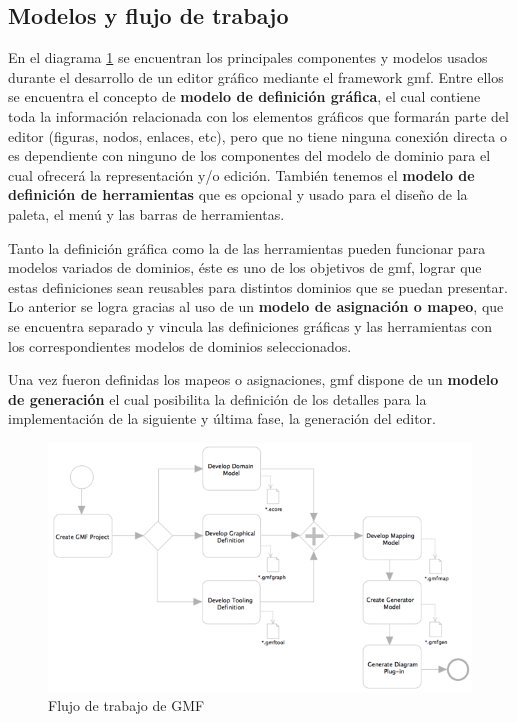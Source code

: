 \documentclass[a4paper,12pt,oneside,spanish]{book}
\begin{document}
\subsection{Modelos y flujo de trabajo}

En el diagrama \ref{fig:GMFWorkflow} se encuentran los principales componentes y modelos usados durante el desarrollo de un editor gráfico mediante el framework \gls{gmf}. Entre ellos se encuentra el concepto de \textbf{modelo de definición gráfica}, el cual contiene toda la información relacionada con los elementos gráficos que formarán parte del editor (figuras, nodos, enlaces, etc), pero que no tiene ninguna conexión directa o es dependiente con ninguno de los componentes del modelo de dominio para el cual ofrecerá la representación y/o edición. También tenemos el \textbf{modelo de definición de herramientas} que es opcional y usado para el diseño de la paleta, el menú y las barras de herramientas.

Tanto la definición gráfica como la de las herramientas pueden funcionar para modelos variados de dominios, éste es uno de los objetivos de \gls{gmf}, lograr que estas definiciones sean reusables para distintos dominios que se puedan presentar. Lo anterior se logra gracias al uso de un \textbf{modelo de asignación o mapeo}, que se encuentra separado y vincula las definiciones gráficas y las herramientas con los correspondientes modelos de dominios seleccionados.

Una vez fueron definidas los mapeos o asignaciones, \gls{gmf} dispone de un \textbf{modelo de generación} el cual posibilita la definición de los detalles para la implementación de la siguiente y última fase, la generación del editor.


\begin{figure}[hbtp]
\centering
\includegraphics[scale=.65]{./img/GMFWorkflow}
\caption{Flujo de trabajo de GMF}
\label{fig:GMFWorkflow}
\end{figure}
\end{document}
